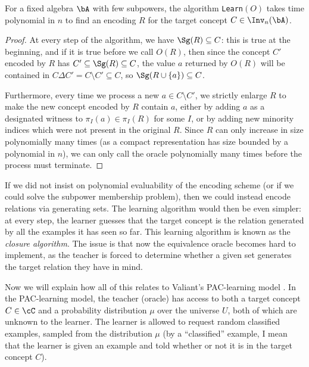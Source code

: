 \begin{prop} For a fixed algebra $\bA$ with few subpowers, the algorithm \texttt{Learn}$(O)$ takes time polynomial in $n$ to find an encoding $R$ for the target concept $C \in \Inv_n(\bA)$.
\end{prop}
\begin{proof} At every step of the algorithm, we have $\Sg(R) \subseteq C$: this is true at the beginning, and if it is true before we call $O(R)$, then since the concept $C'$ encoded by $R$ has $C' \subseteq \Sg(R) \subseteq C$, the value $a$ returned by $O(R)$ will be contained in $C\Delta C' = C \setminus C' \subseteq C$, so $\Sg(R \cup \{a\}) \subseteq C$.

Furthermore, every time we process a new $a \in C\setminus C'$, we strictly enlarge $R$ to make the new concept encoded by $R$ contain $a$, either by adding $a$ as a designated witness to $\pi_I(a) \in \pi_I(R)$ for some $I$, or by adding new minority indices which were not present in the original $R$. Since $R$ can only increase in size polynomially many times (as a compact representation has size bounded by a polynomial in $n$), we can only call the oracle polynomially many times before the process must terminate.
\end{proof}

\begin{rem} If we did not insist on polynomial evaluability of the encoding scheme (or if we could solve the subpower membership problem), then we could instead encode relations via generating sets. The learning algorithm would then be even simpler: at every step, the learner guesses that the target concept is the relation generated by all the examples it has seen so far. This learning algorithm is known as the \emph{closure algorithm}. The issue is that now the equivalence oracle becomes hard to implement, as the teacher is forced to determine whether a given set generates the target relation they have in mind.%
\end{rem}

Now we will explain how all of this relates to Valiant's PAC-learning model \cite{valiant-pac}. In the PAC-learning model, the teacher (oracle) has access to both a target concept $C \in \cC$ and a probability distribution $\mu$ over the universe $U$, both of which are unknown to the learner. The learner is allowed to request random classified examples, sampled from the distribution $\mu$ (by a ``classified'' example, I mean that the learner is given an example and told whether or not it is in the target concept $C$).

